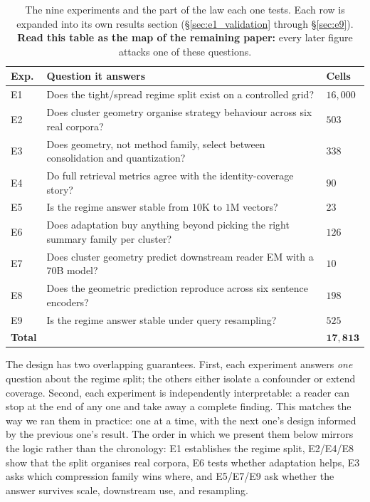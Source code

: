 \begin{table}[h]
\centering
\small
\begin{tabular}{lll}
\toprule
\textbf{Exp.} & \textbf{Question it answers} & \textbf{Cells} \\
\midrule
E1 & Does the tight/spread regime split exist on a controlled grid? & $16{,}000$ \\
E2 & Does cluster geometry organise strategy behaviour across six real corpora? & $503$ \\
E3 & Does geometry, not method family, select between consolidation and quantization? & $338$ \\
E4 & Do full retrieval metrics agree with the identity-coverage story? & $90$ \\
E5 & Is the regime answer stable from $10$K to $1$M vectors? & $23$ \\
E6 & Does adaptation buy anything beyond picking the right summary family per cluster? & $126$ \\
E7 & Does cluster geometry predict downstream reader EM with a $70$B model? & $10$ \\
E8 & Does the geometric prediction reproduce across six sentence encoders? & $198$ \\
E9 & Is the regime answer stable under query resampling? & $525$ \\
\midrule
\textbf{Total} & & $\mathbf{17{,}813}$ \\
\bottomrule
\end{tabular}
\caption{The nine experiments and the part of the law each one tests.
Each row is expanded into its own results section
(\S\ref{sec:e1_validation} through \S\ref{sec:e9}). \textbf{Read
this table as the map of the remaining paper:} every later figure
attacks one of these questions.}
\label{tab:experiment_matrix}
\end{table}

The design has two overlapping guarantees. First, each experiment
answers \emph{one} question about the regime split; the others
either isolate a confounder or extend coverage. Second, each
experiment is independently interpretable: a reader can stop at
the end of any one and take away a complete finding. This matches
the way we ran them in practice: one at a time, with the next
one's design informed by the previous one's result. The order in
which we present them below mirrors the logic rather than the
chronology: E1 establishes the regime split, E2/E4/E8 show that
the split organises real corpora, E6 tests whether adaptation
helps, E3 asks which compression family wins where, and E5/E7/E9
ask whether the answer survives scale, downstream use, and
resampling.

